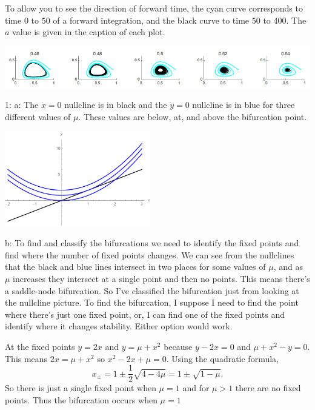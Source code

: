 \documentclass[12pt,letterpaper,noanswers]{exam}
\begin{document}
\begin{questions}
\begin{parts}
To allow you to see the direction of forward time, the cyan curve corresponds to time $0$ to $50$ of a forward integration, and the black curve to time $50$ to $400$.  The $a$ value is given in the caption of each plot.

\includegraphics[width=6in]{img/S19C17p1.png}

\end{parts}

\end{questions}

\eject

1: a: The $\dot{x} = 0$ nullcline is in black and the $\dot{y} = 0$ nullcline is in blue for three different values of $\mu$.  These values
are below, at, and above the bifurcation point.


\includegraphics[width=2.5in]{img/C15nullclines.pdf}


b: To find and classify the bifurcations we need to identify the fixed points and find where the number of fixed points changes.
We can see from the nullclines that the black and blue lines intersect in two places for some values of $\mu$, and as $\mu$ increases
they intersect at a single point and then no points.  This means there's a saddle-node bifurcation.  So I've classified the bifurcation just
from looking at the nullcline picture.  To find the bifurcation, I suppose I need to find the point where there's just one fixed point, or, I can
find one of the fixed points and identify where it changes stability.  Either option would work.

At the fixed points $y = 2x$ and $y = \mu + x^2$ because $y-2x = 0$ and $\mu + x^2 - y = 0$.
This means $2x = \mu + x^2$ so $x^2 - 2x + \mu = 0$.  Using the quadratic formula,
\[x_\pm = 1 \pm \frac{1}{2} \sqrt{4 - 4\mu} = 1\pm \sqrt{1 - \mu}.\]
So there is just a single fixed point when $\mu = 1$ and for $\mu >1$ there are no fixed points.  Thus the bifurcation occurs
when $\mu = 1$ %
\end{document}
